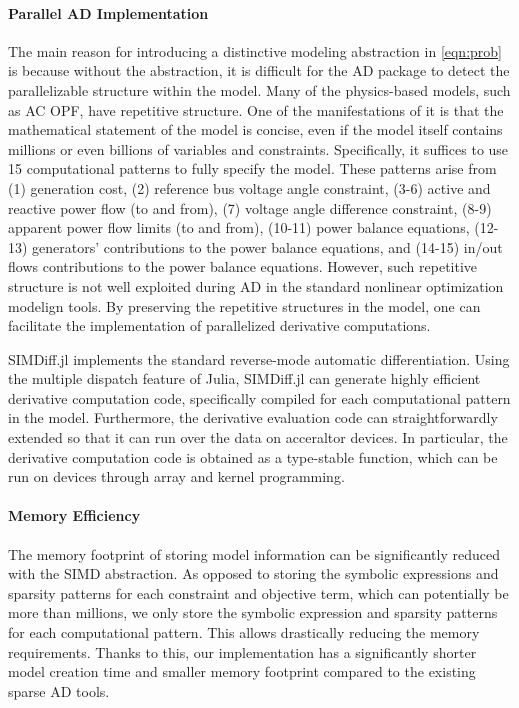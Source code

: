\paragraph{Parallel AD Implementation}
The main reason for introducing a distinctive modeling abstraction in
\eqref{eqn:prob} is because without the abstraction, it is difficult
for the AD package to detect the parallelizable structure within the
model. Many of the physics-based models, such as AC OPF, have
repetitive structure. One of the manifestations of it is
that the mathematical statement of the model is concise, even if the
model itself contains millions or even billions of variables and
constraints. Specifically, it suffices to use 15 computational
patterns to fully specify the model. These patterns arise from (1)
generation cost, (2) reference bus voltage angle constraint, (3-6)
active and reactive power flow (to and from), (7) voltage angle
difference constraint, (8-9) apparent power flow limits (to and from),
(10-11) power balance equations, (12-13) generators' contributions to
the power balance equations, and (14-15) in/out flows contributions to
the power balance equations. However, such repetitive structure is not
well exploited during AD in the standard
nonlinear optimization modelign tools. By preserving the repetitive
structures in the model, one can facilitate the implementation of
parallelized derivative computations.

SIMDiff.jl implements the standard reverse-mode automatic
differentiation. Using the multiple dispatch feature of Julia,
SIMDiff.jl can generate highly efficient derivative computation code,
specifically compiled for each computational pattern in the model. Furthermore,
the derivative evaluation code can straightforwardly extended so that
it can run over the data on acceraltor devices. In particular,
the derivative computation code is obtained as a type-stable function,
which can be run on devices through array and kernel programming.

\paragraph{Memory Efficiency}
The memory footprint of storing model
information can be significantly reduced with the SIMD abstraction. As
opposed to storing the symbolic expressions and sparsity patterns for
each constraint and objective term, which can potentially be more than
millions, we only store the symbolic expression and sparsity patterns
for each computational pattern. This allows drastically reducing the
memory requirements. Thanks to this, our implementation has a
significantly shorter model creation time and smaller memory footprint
compared to the existing sparse AD tools.

